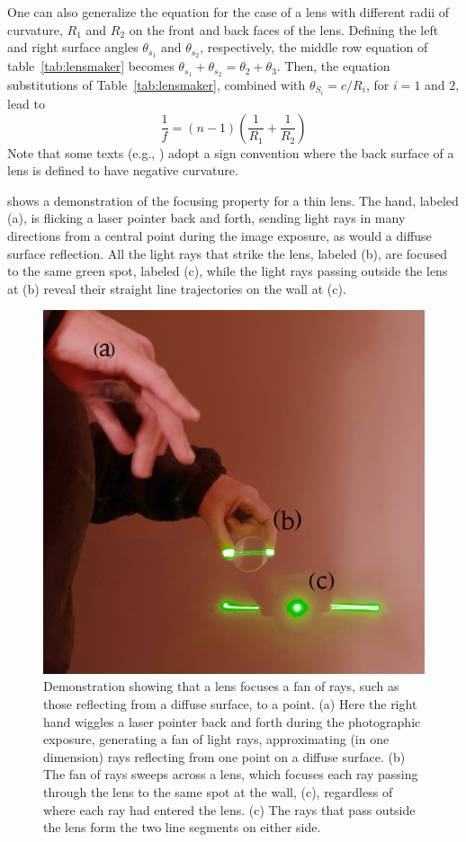 One can also generalize the equation for the case of a lens with different radii of curvature, $R_1$ and $R_2$ on the front and back faces of the lens.  Defining the left and right surface angles $\theta_{s_1}$ and $\theta_{s_2}$, respectively, the middle row equation of table~\ref{tab:lensmaker} becomes $\theta_{s_1} + \theta_{s_2} = \theta_2 + \theta_3$.  Then, the equation substitutions of Table~\ref{tab:lensmaker}, combined with $\theta_{S_i} = c / R_i$, for $i = 1$ and $2$,
lead to
\begin{equation}
    \frac{1}{f} = (n-1) \left( \frac{1}{R_1} + \frac{1}{R_2} \right)
\end{equation}
Note that some texts (e.g., \cite{Hecht2016}) adopt a sign convention where the back surface of a lens is defined to have negative curvature.


\Fig{\ref{fig:greenLaser}} shows a demonstration of the focusing
property for a thin lens. %
The hand, labeled (a), is flicking a laser pointer back and forth,
sending light rays in many directions from a central point during the image exposure, as would a diffuse surface reflection.  All the light rays that strike the lens, labeled (b), are focused to the same green spot, labeled (c), while the light rays passing  outside the lens at (b) reveal their straight line trajectories on the wall at (c).


\begin{figure}
\centerline{
\includegraphics[width=0.6\linewidth]{figures/imaging/greenLaserBrightenedCrop2.jpg}
}
\caption{Demonstration showing that a lens focuses a fan of rays, such as those reflecting from a diffuse surface, to a point.  (a) Here the right hand wiggles a laser pointer back and forth during the photographic exposure, generating a fan of light rays, approximating (in one dimension) rays reflecting from one point on a diffuse surface.   (b) The fan of rays sweeps across a lens, which focuses each ray passing through the lens to the same spot at the wall, (c), regardless of where each ray had entered the lens.  (c) The rays that pass outside the lens form the two line segments on either side.}
\label{fig:greenLaser}
\end{figure}
\clearpage %

